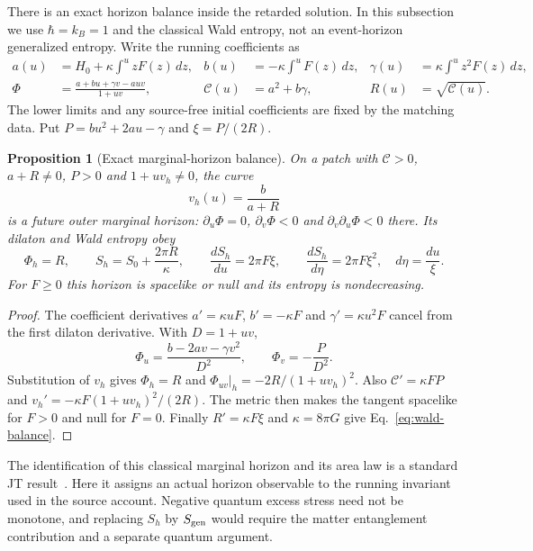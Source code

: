 \documentclass[12pt,a4paper]{article}
\newtheorem{proposition}[theorem]{Proposition}
\begin{document}
There is an exact horizon balance inside the retarded solution. In this subsection
we use $\hbar=k_B=1$ and the classical Wald entropy, not an event-horizon
generalized entropy. Write the running coefficients as
\begin{align}
 a(u)&=H_0+\kappa\int^u zF(z)\,dz,&
 b(u)&=-\kappa\int^u F(z)\,dz,&
 \gamma(u)&=\kappa\int^u z^2F(z)\,dz,\nonumber\\
 \Phi&=\frac{a+bu+\gamma v-auv}{1+uv},&
 \mathcal C(u)&=a^2+b\gamma,& R(u)&=\sqrt{\mathcal C(u)}.
 \label{eq:running-coeff}
\end{align}
The lower limits and any source-free initial coefficients are fixed by the
matching data. Put $P=bu^2+2au-\gamma$ and $\xi=P/(2R)$.

\begin{proposition}[Exact marginal-horizon balance]\label{prop:horizon-balance}
On a patch with $\mathcal C>0$, $a+R\ne0$, $P>0$ and $1+uv_h\ne0$, the curve
\[
 v_h(u)=\frac{b}{a+R}
\]
is a future outer marginal horizon: $\partial_u\Phi=0$,
$\partial_v\Phi<0$ and $\partial_v\partial_u\Phi<0$ there. Its dilaton and Wald
entropy obey
\begin{equation}\label{eq:wald-balance}
 \Phi_h=R,\qquad S_h=S_0+\frac{2\pi R}{\kappa},\qquad
 \frac{dS_h}{du}=2\pi F\xi,\qquad
 \frac{dS_h}{d\eta}=2\pi F\xi^2,\quad d\eta=\frac{du}{\xi}.
\end{equation}
For $F\ge0$ this horizon is spacelike or null and its entropy is nondecreasing.
\end{proposition}
\begin{proof}
The coefficient derivatives $a'=\kappa uF$, $b'=-\kappa F$ and
$\gamma'=\kappa u^2F$ cancel from the first dilaton derivative. With $D=1+uv$,
\[
 \Phi_u=\frac{b-2av-\gamma v^2}{D^2},\qquad
 \Phi_v=-\frac{P}{D^2}.
\]
Substitution of $v_h$ gives $\Phi_h=R$ and
$\Phi_{uv}|_h=-2R/(1+uv_h)^2$. Also
$\mathcal C'=\kappa FP$ and
$v_h'=-\kappa F(1+uv_h)^2/(2R)$. The metric then makes the tangent spacelike
for $F>0$ and null for $F=0$. Finally $R'=\kappa F\xi$ and $\kappa=8\pi G$
give Eq.~\eqref{eq:wald-balance}.
\end{proof}

The identification of this classical marginal horizon and its area law is a
standard JT result~\cite[Sec.~2.3.1]{Moitra2020}. Here it assigns an actual
horizon observable to the running invariant used in the source account.
Negative quantum excess stress need not be monotone, and replacing $S_h$ by
$S_{\rm gen}$ would require the matter entanglement contribution and a separate
quantum argument.
\end{document}
